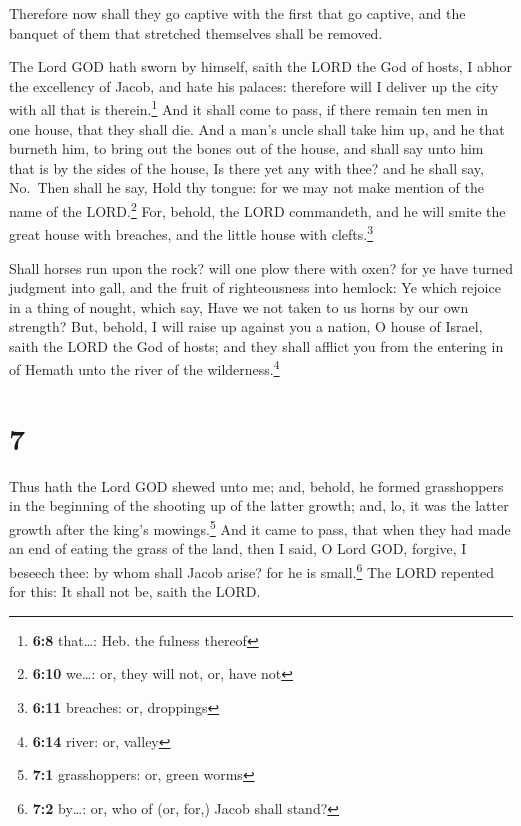  Therefore now shall they go captive with the first that
go captive, and the banquet of them that stretched themselves shall be
removed.

 The Lord GOD hath sworn by himself, saith the LORD the
God of hosts, I abhor the excellency of Jacob, and hate his palaces:
therefore will I deliver up the city with all that is
therein.\footnote{\textbf{6:8} that\ldots: Heb. the fulness thereof}
 And it shall come to pass, if there remain ten men in one
house, that they shall die.  And a man's uncle shall take
him up, and he that burneth him, to bring out the bones out of the
house, and shall say unto him that is by the sides of the house, Is
there yet any with thee? and he shall say, No.~Then shall he say, Hold
thy tongue: for we may not make mention of the name of the
LORD.\footnote{\textbf{6:10} we\ldots: or, they will not, or, have not}
 For, behold, the LORD commandeth, and he will smite the
great house with breaches, and the little house with clefts.\footnote{\textbf{6:11}
  breaches: or, droppings}

 Shall horses run upon the rock? will one plow there with
oxen? for ye have turned judgment into gall, and the fruit of
righteousness into hemlock:  Ye which rejoice in a thing
of nought, which say, Have we not taken to us horns by our own strength?
 But, behold, I will raise up against you a nation, O
house of Israel, saith the LORD the God of hosts; and they shall afflict
you from the entering in of Hemath unto the river of the
wilderness.\footnote{\textbf{6:14} river: or, valley}

\hypertarget{section-6}{%
\section{7}\label{section-6}}

 Thus hath the Lord GOD shewed unto me; and, behold, he
formed grasshoppers in the beginning of the shooting up of the latter
growth; and, lo, it was the latter growth after the king's
mowings.\footnote{\textbf{7:1} grasshoppers: or, green worms}
 And it came to pass, that when they had made an end of
eating the grass of the land, then I said, O Lord GOD, forgive, I
beseech thee: by whom shall Jacob arise? for he is small.\footnote{\textbf{7:2}
  by\ldots: or, who of (or, for,) Jacob shall stand?}  The
LORD repented for this: It shall not be, saith the LORD.

